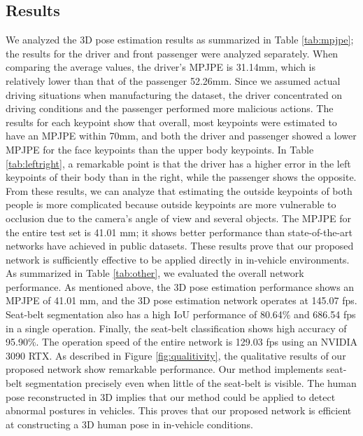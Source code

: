 \documentclass[letterpaper]{article} %
\begin{document}
\subsection{Results}
We analyzed the 3D pose estimation results as summarized in Table \ref{tab:mpjpe}; the results for the driver and front passenger were analyzed separately. When comparing the average values, the driver's MPJPE is 31.14mm, which is relatively lower than that of the passenger 52.26mm. Since we assumed actual driving situations when manufacturing the dataset, the driver concentrated on driving conditions and the passenger performed more malicious actions. The results for each keypoint show that overall, most keypoints were estimated to have an MPJPE within 70mm, and both the driver and passenger showed a lower MPJPE for the face keypoints than the upper body keypoints. In Table \ref{tab:leftright}, a remarkable point is that the driver has a higher error in the left keypoints of their body than in the right, while the passenger shows the opposite. From these results, we can analyze that estimating the outside keypoints of both people is more complicated because outside keypoints are more vulnerable to occlusion due to the camera's angle of view and several objects. The MPJPE for the entire test set is 41.01 mm; it shows better performance than state-of-the-art networks have achieved in public datasets. These results prove that our proposed network is sufficiently effective to be applied directly in in-vehicle environments.  As summarized in Table \ref{tab:other}, we evaluated the overall network performance. As mentioned above, the 3D pose estimation performance shows an MPJPE of 41.01 mm, and the 3D pose estimation network operates at 145.07 fps. Seat-belt segmentation also has a high IoU performance of 80.64\% and 686.54 fps in a single operation. Finally, the seat-belt classification shows high accuracy of 95.90\%. The operation speed of the entire network is 129.03 fps using an NVIDIA 3090 RTX. As described in Figure \ref{fig:qualitivity}, the qualitative results of our proposed network show remarkable performance. Our method implements seat-belt segmentation precisely even when little of the seat-belt is visible. The human pose reconstructed in 3D implies that our method could be applied to detect abnormal postures in vehicles. This proves that our proposed network is efficient at constructing a 3D human pose in in-vehicle conditions.

\vspace{-2.67mm}
\end{document}

